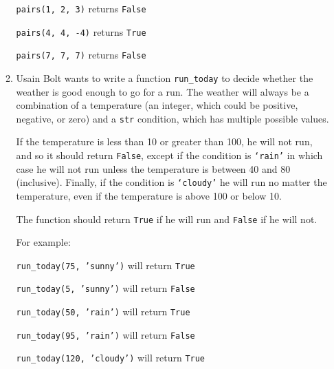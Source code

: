 \documentclass{article}[10 pt]
\begin{document}
\begin{enumerate}
\begin{enumerate}
  \texttt{pairs(1, 2, 3)} returns \texttt{False}

  \texttt{pairs(4, 4, -4)} returns \texttt{True}

  \texttt{pairs(7, 7, 7)} returns \texttt{False}


\item  Usain Bolt wants to write a function \texttt{run\_today} to decide whether the weather is good enough to go for a run. The weather will always be a combination of a temperature (an integer, which could be positive, negative, or zero) and a \texttt{str} condition, which has multiple possible values.

    If the temperature is less than 10 or greater than 100, he will not run, and so it should return \texttt{False}, except if the condition is \texttt{`rain'} in which case he will not run unless the temperature is between 40 and 80 (inclusive). Finally, if the condition is \texttt{`cloudy'} he will run no matter the temperature, even if the temperature is above 100 or below 10.

    The function should return \texttt{True} if he will run and \texttt{False} if he will not.

    For example:

    \texttt{run\_today(75, 'sunny')} will return \texttt{True}

     \texttt{run\_today(5, 'sunny')} will return \texttt{False}

      \texttt{run\_today(50, 'rain')} will return \texttt{True}

       \texttt{run\_today(95, 'rain')} will return \texttt{False}

        \texttt{run\_today(120, 'cloudy')} will return \texttt{True}



\end{enumerate}

\end{enumerate}
\end{document}
